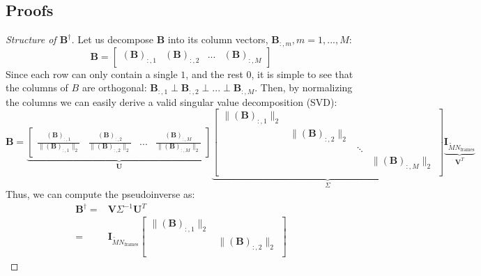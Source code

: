 \documentclass[11pt]{article}
\begin{document}
\subsection{Proofs} \label{proofs}
\begin{proof}[Structure of $\mathbf{B}^\dagger$]

    Let us decompose $\mathbf{B}$ into its column vectors, $\mathbf{B}_{:,m}, m = 1,...,M$:
    \begin{equation*}
        \mathbf{B} = \begin{bmatrix} (\mathbf{B})_{:,1} &(\mathbf{B})_{:,2} &... &(\mathbf{B})_{:,M} \end{bmatrix} 
    \end{equation*}
    Since each row can only contain a single $1$, and the rest $0$, it is simple to see that the columns of $B$ are orthogonal: $\mathbf{B}_{:,1} \perp \mathbf{B}_{:,2} \perp ... \perp \mathbf{B}_{:,M}$.
    Then, by normalizing the columns we can easily derive a valid singular value decomposition (SVD):
    \begin{equation*}
        \mathbf{B} = 
        \underbrace{\begin{bmatrix} \frac{(\mathbf{B})_{:,1}}{\|(\mathbf{B})_{:,1}\|_2} & \frac{(\mathbf{B})_{:,2}}{\|(\mathbf{B})_{:,2}\|_2} &... & \frac{(\mathbf{B})_{:,M}}{\|(\mathbf{B})_{:,M}\|_2} \end{bmatrix}}_{\mathbf{U}}
        \underbrace{\begin{bmatrix}
            \|(\mathbf{B})_{:,1}\|_2 \\
            & \|(\mathbf{B})_{:,2}\|_2 \\
            & & \ddots \\
            & & & \|(\mathbf{B})_{:,M}\|_2 \\
        \end{bmatrix}
        }_{\Sigma}
        \underbrace{\mathbf{I}_{\tilde{M}N_\mathrm{frames}}}_{\mathbf{V}^T}
    \end{equation*}
    Thus, we can compute the pseudoinverse as:
    \begin{equation*}
        \begin{aligned}
            \mathbf{B}^\dagger =& \mathbf{V}\Sigma^{-1}\mathbf{U}^T \\
            = &
            \mathbf{I}_{\tilde{M}N_\mathrm{frames}} 
            \begin{bmatrix}
            \|(\mathbf{B})_{:,1}\|_2 \\
            & \|(\mathbf{B})_{:,2}\|_2 \\

\end{bmatrix}
\end{aligned}
\end{equation*}
\end{proof}
\end{document}
